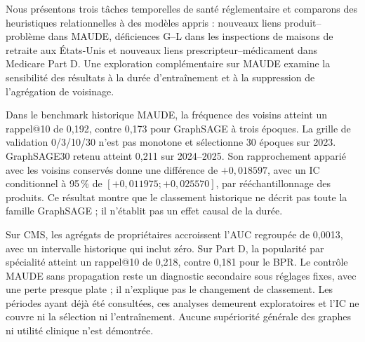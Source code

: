 Nous présentons trois tâches temporelles de santé réglementaire et comparons des heuristiques relationnelles à des modèles appris : nouveaux liens produit--problème dans MAUDE, déficiences G--L dans les inspections de maisons de retraite aux États-Unis et nouveaux liens prescripteur--médicament dans Medicare Part D. Une exploration complémentaire sur MAUDE examine la sensibilité des résultats à la durée d'entraînement et à la suppression de l'agrégation de voisinage.

Dans le benchmark historique MAUDE, la fréquence des voisins atteint un rappel@10 de 0,192, contre 0,173 pour GraphSAGE à trois époques. La grille de validation 0/3/10/30 n'est pas monotone et sélectionne 30 époques sur 2023. GraphSAGE30 retenu atteint 0,211 sur 2024--2025. Son rapprochement apparié avec les voisins conservés donne une différence de $+0,018597$, avec un IC conditionnel à 95\,\% de $[+0,011975;+0,025570]$, par rééchantillonnage des produits. Ce résultat montre que le classement historique ne décrit pas toute la famille GraphSAGE ; il n'établit pas un effet causal de la durée.

Sur CMS, les agrégats de propriétaires accroissent l'AUC regroupée de 0,0013, avec un intervalle historique qui inclut zéro. Sur Part D, la popularité par spécialité atteint un rappel@10 de 0,218, contre 0,181 pour le BPR. Le contrôle MAUDE sans propagation reste un diagnostic secondaire sous réglages fixes, avec une perte presque plate ; il n'explique pas le changement de classement. Les périodes ayant déjà été consultées, ces analyses demeurent exploratoires et l'IC ne couvre ni la sélection ni l'entraînement. Aucune supériorité générale des graphes ni utilité clinique n'est démontrée.
